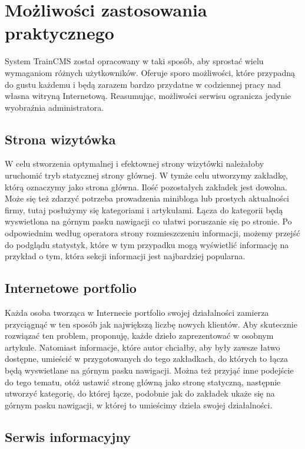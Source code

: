 \documentclass[openright]{xmgr}
\begin{document}
\newpage

\section{Możliwości zastosowania praktycznego}

System TrainCMS został opracowany w taki sposób, aby sprostać wielu wymaganiom różnych użytkowników. Oferuje sporo możliwości, które przypadną do gustu każdemu i będą zarazem bardzo przydatne w codziennej pracy nad własna witryną Internetową. Reasumując, możliwości serwisu ogranicza jedynie wyobraźnia administratora.

\subsection{Strona wizytówka}

W celu stworzenia optymalnej i efektownej strony wizytówki należałoby uruchomić tryb statycznej strony głównej. W tymże celu utworzymy zakładkę, którą oznaczymy jako strona główna. Ilość pozostałych zakładek jest dowolna. Może się też zdarzyć potrzeba prowadzenia minibloga lub prostych aktualności firmy, tutaj posłużymy się kategoriami i artykułami. Łącza do kategorii będą wyswietlona na górnym pasku nawigacji co ułatwi poruszanie się po stronie.  Po odpowiednim według operatora strony rozmieszczeniu informacji, możemy przejść do podglądu statystyk, które w tym przypadku mogą wyświetlić informację na przykład o tym, która sekcji informacji jest najbardziej popularna. 

\subsection{Internetowe portfolio}

Każda osoba tworząca w Internecie portfolio swojej działalności zamierza przyciągnąć w ten sposób jak największą liczbę nowych klientów. Aby skutecznie rozwiązać ten problem, proponuję, każde dzieło zaprezentować w osobnym artykule. Natomiast informacje, które autor chciałby, aby były zawsze łatwo dostępne, umieścić w przygotowanych do tego zakładkach, do których to łącza będą wyswietlane na górnym pasku nawigacji. Można też przyjąć inne podejście do tego tematu, otóż ustawić stronę główną jako stronę statyczną, następnie utworzyć kategorię, do której łącze, podobnie jak do zakładek ukaże się na górnym pasku nawigacji, w której to umieścimy dzieła swojej działalności. 

\subsection{Serwis informacyjny}
\end{document}
